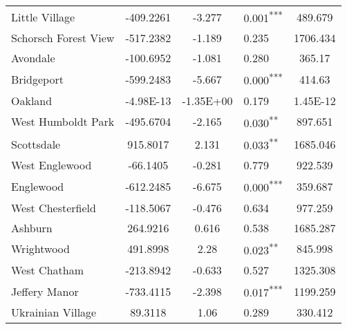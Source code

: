 \documentclass[12pt]{report}
\begin{document}
\begin{longtable}{l S[table-format=6.4] S[table-format=3.4] l S[table-format=4.4]}
	Little Village               & -409.2261            & -3.277           & 0.001\textsuperscript{***} & 489.679                           \\
	Schorsch Forest View         & -517.2382            & -1.189           & 0.235                      & 1706.434                          \\
	Avondale                     & -100.6952            & -1.081           & 0.280                      & 365.17                            \\
	Bridgeport                   & -599.2483            & -5.667           & 0.000\textsuperscript{***} & 414.63                            \\
	Oakland                      & -4.98E-13            & -1.35E+00        & 0.179                      & 1.45E-12                          \\
	West Humboldt Park           & -495.6704            & -2.165           & 0.030\textsuperscript{**}  & 897.651                           \\
	Scottsdale                   & 915.8017             & 2.131            & 0.033\textsuperscript{**}  & 1685.046                          \\
	West Englewood               & -66.1405             & -0.281           & 0.779                      & 922.539                           \\
	Englewood                    & -612.2485            & -6.675           & 0.000\textsuperscript{***} & 359.687                           \\
	West Chesterfield            & -118.5067            & -0.476           & 0.634                      & 977.259                           \\
	Ashburn                      & 264.9216             & 0.616            & 0.538                      & 1685.287                          \\
	Wrightwood                   & 491.8998             & 2.28             & 0.023\textsuperscript{**}  & 845.998                           \\
	West Chatham                 & -213.8942            & -0.633           & 0.527                      & 1325.308                          \\
	Jeffery Manor                & -733.4115            & -2.398           & 0.017\textsuperscript{***} & 1199.259                          \\
	Ukrainian Village            & 89.3118              & 1.06             & 0.289                      & 330.412                           \\

\end{longtable}
\end{document}
